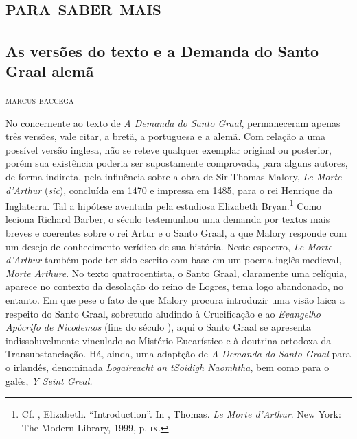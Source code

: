 \part{\textsc{para saber mais}}

\chapter{As versões do texto e a Demanda do Santo Graal alemã}

\begin{flushright}
\textsc{marcus baccega}
\end{flushright}


\noindent{}No concernente ao texto de \textit{A Demanda do Santo Graal}, permaneceram
apenas três versões, vale citar, a bretã, a portuguesa e a alemã. Com relação a
uma possível versão inglesa, não se reteve qualquer exemplar original ou
posterior, porém sua existência poderia ser supostamente comprovada, para alguns
autores, de forma indireta, pela influência sobre a obra de Sir Thomas Malory,
\textit{Le Morte d’Arthur} (\textit{sic}), concluída em 1470 e impressa em 1485,
para o rei Henrique  da Inglaterra. Tal a hipótese aventada pela
estudiosa Elizabeth Bryan.\footnote{ Cf. , Elizabeth. ``Introduction''. In
, Thomas. \textit{Le Morte d'Arthur}. New York: The Modern Library, 1999,
p. \textsc{ix}. } Como leciona Richard Barber, o século  testemunhou
uma demanda por textos mais breves e coerentes sobre o rei Artur e o Santo
Graal, a que Malory responde com um desejo de conhecimento verídico de sua história.
Neste espectro, \textit{Le Morte d’Arthur} também pode ter sido
escrito com base em um poema inglês medieval, \textit{Morte Arthure}. No texto
quatrocentista, o Santo Graal, claramente uma relíquia, aparece no contexto da
desolação do reino de Logres, tema logo abandonado, no entanto. Em que pese o
fato de que Malory procura introduzir uma visão laica a respeito do Santo Graal,
sobretudo aludindo à Crucificação e ao \textit{Evangelho Apócrifo de Nicodemos}
(fins do século ), aqui o Santo Graal se apresenta indissoluvelmente
vinculado ao Mistério Eucarístico e à doutrina ortodoxa da Transubstanciação.
Há, ainda, uma adaptção de \textit{A Demanda do Santo Graal}  para o irlandês,
denominada \textit{Logaireacht an tSoidigh Naomhtha}, bem como para o galês,
\textit{Y Seint Greal.}

